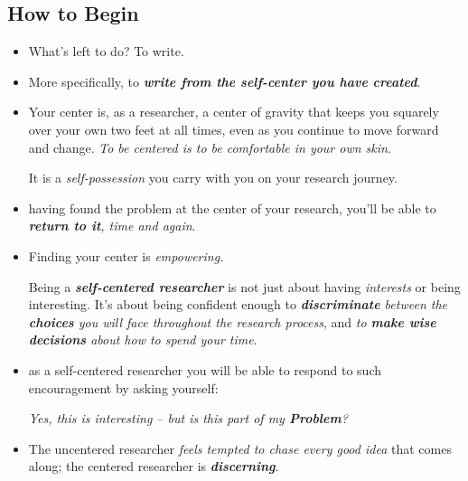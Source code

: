 \documentclass[11pt]{article}
\begin{document}
\subsection{How to Begin}
\begin{itemize}
\item What’s left to do? To write.

\item More specifically, to \emph{\textbf{write from the self-center you have created}}. 

\item  Your center is, as a researcher, a center of gravity that keeps you squarely over your own two feet at all times, even as you continue to move forward and change. \emph{To be centered is to be comfortable in your own skin}.

It is a \emph{self-possession} you carry with you on your research journey.

\item  having found the problem at the center of your research, you’ll be able to \emph{\textbf{return to it}, time and again}.

\item Finding your center is \emph{empowering}. 

Being a \emph{\textbf{self-centered researcher}} is not just about having \emph{interests} or being interesting. It’s about being confident enough to \emph{\textbf{discriminate} between the \textbf{choices} you will face throughout the research process}, and \emph{to \textbf{make wise decisions} about how to spend your time}. 

\item as a self-centered researcher you will be able to respond to such encouragement by asking yourself: 

\emph{Yes, this is interesting -- but is this part of my \textbf{Problem}? }

\item The uncentered researcher \emph{feels tempted to chase every good idea} that comes along; the centered researcher is \emph{\textbf{discerning}}.
\end{itemize}
\end{document}

